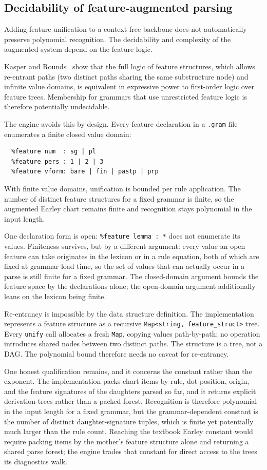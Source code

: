 \documentclass[11pt]{article}
\theoremstyle{definition}
\theoremstyle{plain}
\theoremstyle{remark}
\begin{document}
\subsection{Decidability of feature-augmented parsing}
\label{sec:decidability}

Adding feature unification to a context-free backbone does not automatically preserve
polynomial recognition. The decidability and complexity of the augmented system depend
on the feature logic.

Kasper and Rounds~\cite{kasper1986logical} show that the full logic of feature
structures, which allows re-entrant paths (two distinct paths sharing the same
substructure node) and infinite value domains, is equivalent in expressive power to
first-order logic over feature trees. Membership for grammars that use unrestricted
feature logic is therefore potentially undecidable.

The engine avoids this by design. Every feature declaration in a \texttt{.gram} file
enumerates a finite closed value domain:
\begin{verbatim}
  %feature num  : sg | pl
  %feature pers : 1 | 2 | 3
  %feature vform: bare | fin | pastp | prp
\end{verbatim}
With finite value domains, unification is bounded per rule application. The number of
distinct feature structures for a fixed grammar is finite, so the augmented Earley
chart remains finite and recognition stays polynomial in the input length.

One declaration form is open: \texttt{\%feature lemma : *} does not enumerate its
values. Finiteness survives, but by a different argument: every value an open feature
can take originates in the lexicon or in a rule equation, both of which are fixed at
grammar load time, so the set of values that can actually occur in a parse is still
finite for a fixed grammar. The closed-domain argument bounds the feature space by the
declarations alone; the open-domain argument additionally leans on the lexicon being
finite.

Re-entrancy is impossible by the data structure definition. The implementation
represents a feature structure as a recursive \texttt{Map<string, feature\_struct>}
tree. Every \texttt{unify} call allocates a fresh \texttt{Map}, copying values
path-by-path; no operation introduces shared nodes between two distinct paths.
The structure is a tree, not a DAG. The polynomial bound therefore needs no caveat
for re-entrancy.

One honest qualification remains, and it concerns the constant rather than the
exponent. The implementation packs chart items by rule, dot position, origin, and the
feature signatures of the daughters parsed so far, and it returns explicit derivation
trees rather than a packed forest. Recognition is therefore polynomial in the input
length for a fixed grammar, but the grammar-dependent constant is the number of
distinct daughter-signature tuples, which is finite yet potentially much larger than
the rule count. Reaching the textbook Earley constant would require packing items by
the mother's feature structure alone and returning a shared parse forest; the engine
trades that constant for direct access to the trees its diagnostics walk.
\end{document}
